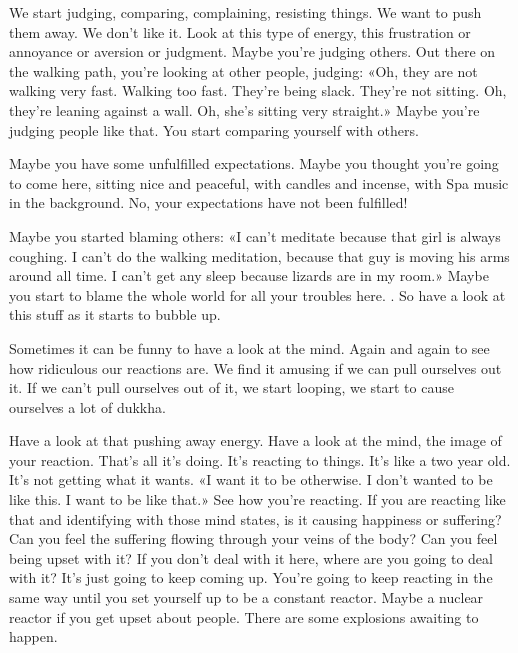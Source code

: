 \documentclass[letterpaper,10pt,english]{sphinxmanual}
\begin{document}
\sphinxAtStartPar
We start judging, comparing, complaining, resisting things. We want to
push them away. We don’t like it. Look at this type of energy, this frustration
or  annoyance  or  aversion  or  judgment.  Maybe  you’re  judging  others.  Out
there on the walking path, you’re looking at other people, judging: «Oh, they
are not walking very fast. Walking too fast. They’re being slack. They’re not
sitting. Oh, they’re leaning against a wall. Oh, she’s sitting very straight.»
Maybe  you’re  judging  people  like  that. You  start  comparing  yourself  with
others.

\sphinxAtStartPar
Maybe  you  have  some  unfulfilled  expectations.  Maybe  you  thought
you’re  going  to  come  here,  sitting  nice  and  peaceful,  with  candles  and
incense, with Spa music in the background. No, your expectations have not
been fulfilled!

\sphinxAtStartPar
Maybe you started blaming others: «I can’t meditate because that girl
is always coughing. I can’t do the walking meditation, because that guy is
moving his arms around all time. I can’t get any sleep because lizards are in
my room.» Maybe you start to blame the whole world for all your troubles
here.
. So have a look at this stuff as it starts to bubble up.

\sphinxAtStartPar
Sometimes it can be funny to have a look at the mind. Again and again
to see how ridiculous our reactions are. We find it amusing if we can pull
ourselves out it. If we can’t pull ourselves out of it, we start looping, we start
to cause ourselves a lot of dukkha.

\sphinxAtStartPar
{}  Have a look at that pushing away energy. Have a look at the mind, the
image of your reaction. That’s all it’s doing. It’s reacting to things. It’s like a
two year old. It’s not getting what it wants. «I want it to be otherwise. I don’t
wanted to be like this. I want to be like that.» See how you’re reacting. If
you are reacting like that and identifying with those mind states, is it causing happiness or suffering? Can you feel the suffering flowing through your
veins of the body? Can you feel being upset with it? If you don’t deal with it
here, where are you going to deal with it? It’s just going to keep coming up.
You’re going to keep reacting in the same way until you set yourself up to
be a constant reactor. Maybe a nuclear reactor if you get upset about people.
There are some explosions awaiting to happen.
\end{document}
